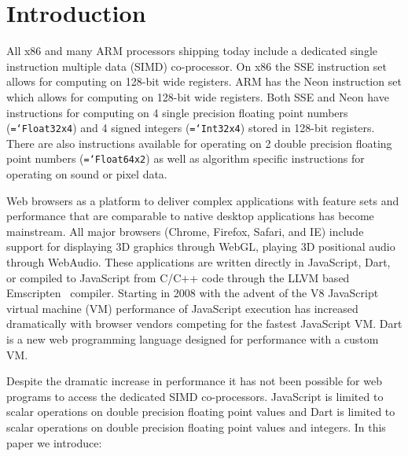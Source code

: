 \documentclass[preprint]{sigplanconf}
\newcommand{\ttt}[1]{{\texttt{\hyphenchar\font=`\-\relax #1}}}%
\begin{document}
\section{Introduction}

All x86 and many ARM processors shipping today include a dedicated single
instruction multiple data (SIMD) co-processor.  On x86 the SSE instruction set
allows for computing on 128-bit wide registers. ARM has the Neon instruction set
which allows for computing on 128-bit wide registers. Both SSE and Neon have
instructions for computing on 4 single precision floating point numbers
(\ttt{Float32x4}) and 4 signed integers (\ttt{Int32x4}) stored in 128-bit
registers. There are also instructions available for operating on 2 double
precision floating point numbers (\ttt{Float64x2}) as well as algorithm specific
instructions for operating on sound or pixel data.

Web browsers as a platform to deliver complex applications with feature sets and
performance that are comparable to native desktop applications has become
mainstream. All major browsers (Chrome, Firefox, Safari, and IE) include support
for displaying 3D graphics through WebGL, playing 3D positional audio through
WebAudio. These applications are written directly in JavaScript, Dart, or
compiled to JavaScript from C/C++ code through the LLVM based
Emscripten~\cite{emscripten} compiler. Starting in 2008 with the advent of the
V8 JavaScript virtual machine (VM) performance of JavaScript execution has
increased dramatically with browser vendors competing for the fastest JavaScript
VM. Dart is a new web programming language designed for performance with a
custom VM.

Despite the dramatic increase in performance it has not been possible for web
programs to access the dedicated SIMD co-processors. JavaScript is limited to
scalar operations on double precision floating point values and Dart is limited
to scalar operations on double precision floating point values and integers. In
this paper we introduce:
\end{document}
